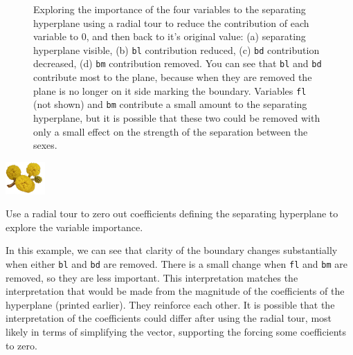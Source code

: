 \documentclass[
  letterpaper,
]{krantz}
\newcommand{\infobox}[1]{%
\noindent\colorbox{info!30}{%
\begin{minipage}{0.98\linewidth}%
    \centering%
    \begin{minipage}[c]{0.15\linewidth} %
      \includegraphics[width=1.5cm]{images/mulga-flowers2.png} %
    \end{minipage}%
    \hfill %
    \begin{minipage}[c]{0.8\linewidth} %
      \bigskip%
      \textsf{#1}%
      \bigskip%
    \end{minipage}%
    \hspace*{3mm}%
  \end{minipage}%
}%
}
\begin{document}
\begin{figure}
\begin{minipage}{0.50\linewidth}
{}


\end{minipage}%
%
\begin{minipage}{0.50\linewidth}



\end{minipage}%

\caption{\label{fig-chinstrap-radial-pdf}Exploring the importance of the
four variables to the separating hyperplane using a radial tour to
reduce the contribution of each variable to 0, and then back to it's
original value: (a) separating hyperplane visible, (b) \texttt{bl}
contribution reduced, (c) \texttt{bd} contribution decreased, (d)
\texttt{bm} contribution removed. You can see that \texttt{bl} and
\texttt{bd} contribute most to the plane, because when they are removed
the plane is no longer on it side marking the boundary. Variables
\texttt{fl} (not shown) and \texttt{bm} contribute a small amount to the
separating hyperplane, but it is possible that these two could be
removed with only a small effect on the strength of the separation
between the sexes.}

\end{figure}%

\infobox{Use a radial tour to zero out coefficients defining the separating hyperplane to explore the variable importance. 
}

In this example, we can see that clarity of the boundary changes
substantially when either \texttt{bl} and \texttt{bd} are removed. There
is a small change when \texttt{fl} and \texttt{bm} are removed, so they
are less important. This interpretation matches the interpretation that
would be made from the magnitude of the coefficients of the hyperplane
(printed earlier). They reinforce each other. It is possible that the
interpretation of the coefficients could differ after using the radial
tour, most likely in terms of simplifying the vector, supporting the
forcing some coefficients to zero.
\end{document}
